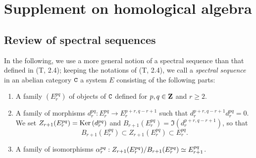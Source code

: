 \section{Supplement on homological algebra}
\label{section-supplement-on-homological-algebra}

\subsection{Review of spectral sequences}
\label{subsection-review-spectral-sequences}

\begin{env}[11.1.1]
\label{0.11.1.1}
In the following, we use a more general notion of a spectral sequence than that defined in (T, 2.4); keeping the notations of (T, 2.4), we call a \emph{spectral sequence} in an abelian category $\mathtt{C}$ a system $E$ consisting of the following parts:
\begin{enumerate}[label=(\alph*)]
  \item A family $(E_r^{pq})$ of objects of $\mathtt{C}$ defined for $p,q\in\mathbf{Z}$ and $r\geqslant 2$.
  \item A family of morphisms $d_r^{pq}:E_r^{pq}\to E_r^{p+r,q-r+1}$ such that $d_r^{p+r,q-r+1}d_r^{pq}=0$.
    We set $Z_{r+1}(E_r^{pq})={\mathop{\mathrm{Ker}}\nolimits}\,(d_r^{pq})$ and $B_{r+1}(E_r^{pq})=\Im(d_r^{p+r,q-r+1})$, so that
    \[
      B_{r+1}(E_r^{pq})\subset Z_{r+1}(E_r^{pq})\subset E_r^{pq}.
    \]
  \item A family of isomorphisms $\alpha_r^{pq}:Z_{r+1}(E_r^{pq})/B_{r+1}(E_r^{pq})\simeq E_{r+1}^{pq}$.


\end{enumerate}
\end{env}
